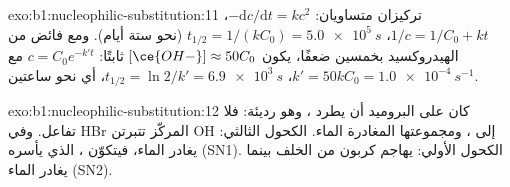 \begin{solution}{exo:b1:nucleophilic-substitution:11}
تركيزان متساويان: $-\mathrm{d}c/\mathrm{d}t = kc^2$، $1/c = 1/C_0 + kt$،
$t_{1/2} = 1/(kC_0) = \qty{5.0e5}{s}$ (نحو ستة أيام). ومع فائض
من الهيدروكسيد بخمسين ضعفًا، يكون $[\ce{OH-}] \approx 50C_0$ ثابتًا: $c = C_0
e^{-k't}$ مع $k' = 50kC_0 = \qty{1.0e-4}{s^{-1}}$، $t_{1/2} = \ln 2/k' =
\qty{6.9e3}{s}$، أي نحو ساعتين.
\end{solution}

\begin{solution}{exo:b1:nucleophilic-substitution:12}
كان على البروميد أن يطرد ، وهو  
رديئة: فلا تفاعل. وفي HBr المركّز تتبرتن OH إلى
، ومجموعتها المغادرة الماء. الكحول الثالثي: يغادر الماء،
فيتكوّن ، الذي يأسره  (SN1). الكحول الأولي:
يهاجم  كربون  من الخلف بينما يغادر الماء
(SN2).
\end{solution}


